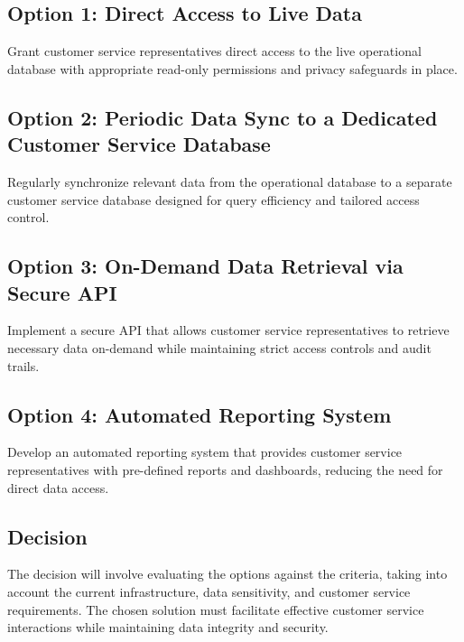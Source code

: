 \subsection*{Option 1: Direct Access to Live Data}
Grant customer service representatives direct access to the live operational database with appropriate read-only permissions and privacy safeguards in place.

\subsection*{Option 2: Periodic Data Sync to a Dedicated Customer Service Database}
Regularly synchronize relevant data from the operational database to a separate customer service database designed for query efficiency and tailored access control.

\subsection*{Option 3: On-Demand Data Retrieval via Secure API}
Implement a secure API that allows customer service representatives to retrieve necessary data on-demand while maintaining strict access controls and audit trails.

\subsection*{Option 4: Automated Reporting System}
Develop an automated reporting system that provides customer service representatives with pre-defined reports and dashboards, reducing the need for direct data access.

\subsection*{Decision}
The decision will involve evaluating the options against the criteria, taking into account the current infrastructure, data sensitivity, and customer service requirements. The chosen solution must facilitate effective customer service interactions while maintaining data integrity and security.

